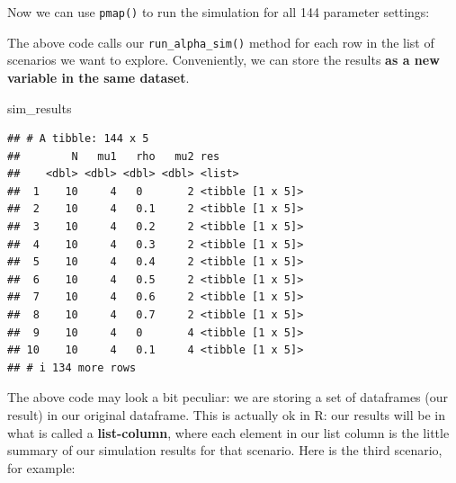 \documentclass[
]{book}
\newenvironment{Shaded}{\begin{snugshade}}{\end{snugshade}}
\newcommand{\AttributeTok}[1]{\textcolor[rgb]{0.13,0.29,0.53}{#1}}
\newcommand{\DecValTok}[1]{\textcolor[rgb]{0.00,0.00,0.81}{#1}}
\newcommand{\FunctionTok}[1]{\textcolor[rgb]{0.13,0.29,0.53}{\textbf{#1}}}
\newcommand{\NormalTok}[1]{#1}
\newcommand{\OtherTok}[1]{\textcolor[rgb]{0.56,0.35,0.01}{#1}}
\newcommand{\SpecialCharTok}[1]{\textcolor[rgb]{0.81,0.36,0.00}{\textbf{#1}}}
\begin{document}
Now we can use \texttt{pmap()} to run the simulation for all 144 parameter settings:

\begin{Shaded}
\end{Shaded}

The above code calls our \texttt{run\_alpha\_sim()} method for each row in the list of scenarios we want to explore.
Conveniently, we can store the results \textbf{as a new variable in the same dataset}.

\begin{Shaded}
\begin{Highlighting}[]
\NormalTok{sim\_results}
\end{Highlighting}
\end{Shaded}

\begin{verbatim}
## # A tibble: 144 x 5
##        N   mu1   rho   mu2 res             
##    <dbl> <dbl> <dbl> <dbl> <list>          
##  1    10     4   0       2 <tibble [1 x 5]>
##  2    10     4   0.1     2 <tibble [1 x 5]>
##  3    10     4   0.2     2 <tibble [1 x 5]>
##  4    10     4   0.3     2 <tibble [1 x 5]>
##  5    10     4   0.4     2 <tibble [1 x 5]>
##  6    10     4   0.5     2 <tibble [1 x 5]>
##  7    10     4   0.6     2 <tibble [1 x 5]>
##  8    10     4   0.7     2 <tibble [1 x 5]>
##  9    10     4   0       4 <tibble [1 x 5]>
## 10    10     4   0.1     4 <tibble [1 x 5]>
## # i 134 more rows
\end{verbatim}

The above code may look a bit peculiar: we are storing a set of dataframes (our result) in our original dataframe.
This is actually ok in R: our results will be in what is called a \textbf{list-column}, where each element in our list column is the little summary of our simulation results for that scenario.
Here is the third scenario, for example:

\begin{Shaded}
\end{Shaded}
\end{document}
